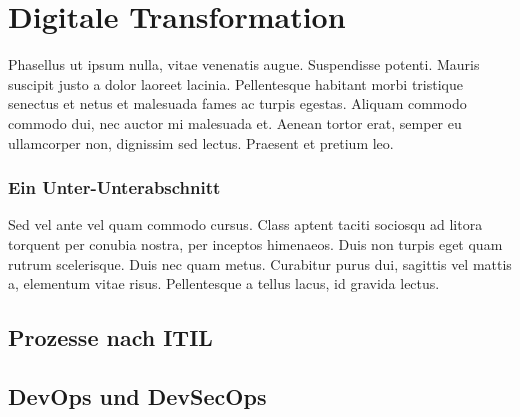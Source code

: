 %
%
\section{Digitale Transformation}
\label{sec:background:second_section}
Phasellus ut ipsum nulla, vitae venenatis augue. Suspendisse potenti. Mauris suscipit justo a dolor laoreet lacinia. Pellentesque habitant morbi tristique senectus et netus et malesuada fames ac turpis egestas. Aliquam commodo commodo dui, nec auctor mi malesuada et. Aenean tortor erat, semper eu ullamcorper non, dignissim sed lectus. Praesent et pretium leo. 

\subsubsection{Ein Unter-Unterabschnitt}
\label{ssubsec:background:second_section:first_subsection:first_subsubsection}
Sed vel ante vel quam commodo cursus. Class aptent taciti sociosqu ad litora torquent per conubia nostra, per inceptos himenaeos. Duis non turpis eget quam rutrum scelerisque. Duis nec quam metus. Curabitur purus dui, sagittis vel mattis a, elementum vitae risus. Pellentesque a tellus lacus, id gravida lectus.

\subsection{Prozesse nach ITIL}

\subsection{DevOps und DevSecOps}
